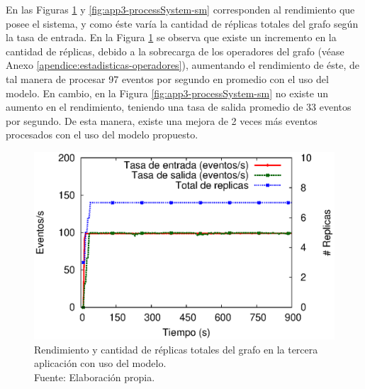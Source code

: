 
En las Figuras \ref{fig:app3-processSystem-cm} y \ref{fig:app3-processSystem-sm} \normalsize{corresponden al rendimiento que posee el sistema, y como \'este var\'ia la cantidad de r\'eplicas totales del grafo seg\'un la tasa de entrada.} En la Figura \ref{fig:app3-processSystem-cm} \normalsize{se observa que existe un incremento en la cantidad de r\'eplicas, debido a la sobrecarga de los operadores del grafo} (v\'ease Anexo \ref{apendice:estadisticas-operadores}), \normalsize{aumentando el rendimiento de \'este, de tal manera de procesar 97 eventos por segundo en promedio con el uso del modelo. En cambio, en la Figura} \ref{fig:app3-processSystem-sm} \normalsize{no existe un aumento en el rendimiento, teniendo una tasa de salida promedio de 33 eventos por segundo. De esta manera, existe una mejora de 2 veces m\'as eventos procesados con el uso del modelo propuesto.}

\begin{figure}[!ht]
	\centering
	\captionsetup{justification=centering}
	\includegraphics[scale=0.7]{images/exp/app3/cm/logical/processSystem.eps}
    \caption[Rendimiento y cantidad de r\'eplicas totales del grafo en la tercera aplicaci\'on con uso del modelo.]{Rendimiento y cantidad de r\'eplicas totales del grafo en la tercera aplicaci\'on con uso del modelo.\\Fuente: Elaboraci\'on propia.}
	\label{fig:app3-processSystem-cm}
\end{figure}

